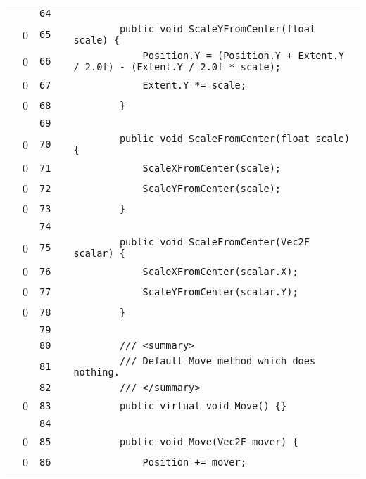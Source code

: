 \documentclass[a4paper,landscape,10pt]{article}
\begin{document}
\begin{longtable}[l]{lrrll}
\cellcolor{gray} &  & \verb~64~ & & \verb~~\\
\cellcolor{red} & 0 & \verb~65~ & & \verb~        public void ScaleYFromCenter(float scale) {~\\
\cellcolor{red} & 0 & \verb~66~ & & \verb~            Position.Y = (Position.Y + Extent.Y / 2.0f) - (Extent.Y / 2.0f * scale);~\\
\cellcolor{red} & 0 & \verb~67~ & & \verb~            Extent.Y *= scale;~\\
\cellcolor{red} & 0 & \verb~68~ & & \verb~        }~\\
\cellcolor{gray} &  & \verb~69~ & & \verb~~\\
\cellcolor{red} & 0 & \verb~70~ & & \verb~        public void ScaleFromCenter(float scale) {~\\
\cellcolor{red} & 0 & \verb~71~ & & \verb~            ScaleXFromCenter(scale);~\\
\cellcolor{red} & 0 & \verb~72~ & & \verb~            ScaleYFromCenter(scale);~\\
\cellcolor{red} & 0 & \verb~73~ & & \verb~        }~\\
\cellcolor{gray} &  & \verb~74~ & & \verb~~\\
\cellcolor{red} & 0 & \verb~75~ & & \verb~        public void ScaleFromCenter(Vec2F scalar) {~\\
\cellcolor{red} & 0 & \verb~76~ & & \verb~            ScaleXFromCenter(scalar.X);~\\
\cellcolor{red} & 0 & \verb~77~ & & \verb~            ScaleYFromCenter(scalar.Y);~\\
\cellcolor{red} & 0 & \verb~78~ & & \verb~        }~\\
\cellcolor{gray} &  & \verb~79~ & & \verb~~\\
\cellcolor{gray} &  & \verb~80~ & & \verb~        /// <summary>~\\
\cellcolor{gray} &  & \verb~81~ & & \verb~        /// Default Move method which does nothing.~\\
\cellcolor{gray} &  & \verb~82~ & & \verb~        /// </summary>~\\
\cellcolor{red} & 0 & \verb~83~ & & \verb~        public virtual void Move() {}~\\
\cellcolor{gray} &  & \verb~84~ & & \verb~~\\
\cellcolor{red} & 0 & \verb~85~ & & \verb~        public void Move(Vec2F mover) {~\\
\cellcolor{red} & 0 & \verb~86~ & & \verb~            Position += mover;~\\

\end{longtable}
\end{document}
